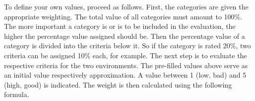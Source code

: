 \documentclass[MSC,Master,english]{twbook}%
\begin{document}
\begin{table}[ht]
    \begin{center}
        \caption{Criteria catalog table}
        \label{tab:cct}
    \end{center}
\end{table}
To define your own values, proceed as follows. First, the categories are given the appropriate weighting. The total value of all categories must amount to 100\%. The more important a category is or is to be included in the evaluation, the higher the percentage value assigned should be. Then the percentage value of a category is divided into the criteria below it. So if the category is rated 20\%, two criteria can be assigned 10\% each, for example. The next step is to evaluate the respective criteria for the two environments. The pre-filled values above serve as an initial value respectively approximation. A value between 1 (low, bad) and 5 (high, good) is indicated. The weight is then calculated using the following formula.
\end{document}

